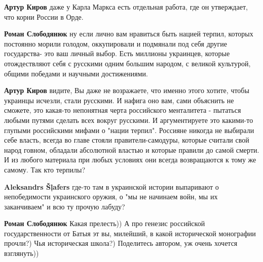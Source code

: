 \begin{itemize}
\begin{itemize}
\textbf{Артур Киров} даже у Карла Маркса есть отдельная работа, где он утверждает, что корни России в Орде.

 
\textbf{Роман Слободянюк} ну если лично вам нравиться быть нацией терпил, которых постоянно морили голодом, оккупировали и подмянали под себя другие государства- это ваш личный выбор. Есть миллионы украинцев, которые отождествляют себя с русскими одним большим народом, с великой культурой, общими победами и научными достижениями.

 
\textbf{Артур Киров} видите, Вы даже не возражаете, что именно этого хотите, чтобы украинцы исчезли, стали русскими. И нафига оно вам, сами объяснить не сможете, это какая-то непонятная черта российского менталитета - пытаться любыми путями сделать всех вокруг русскими. И аргументируете это какими-то глупыми российскими мифами о "нации терпил". Россияне никогда не выбирали себе власть, всегда во главе стояли правители-самодуры, которые считали свой народ говном, обладали абсолютной властью и которые правили до самой смерти. И из любого материала при любых условиях они всегда возвращаются к тому же самому. Так кто терпилы?

 
\textbf{Aleksandrs Šļafers} где-то там в украинской истории выпаривают о непобедимости украинского оружия, о "мы не начинаем войн, мы их заканчиваем" и всю ту прочую лабуду?

 
\textbf{Роман Слободянюк} Какая прелесть)) А про генезис российской государственности от Батыя эт вы, милейший, в какой исторической монографии прочли?) Чья историческая школа?) Поделитесь автором, уж очень хочется взглянуть))


\end{itemize}
\end{itemize}
